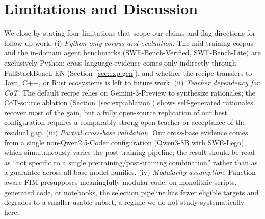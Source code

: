 \section{Limitations and Discussion}
\vspace{-0.5ex}
\label{sec:limitations}

We close by stating four limitations that scope our claims and flag
directions for follow-up work.
(i) \textit{Python-only corpus and evaluation.} The mid-training corpus
and the in-domain agent benchmarks (SWE-Bench-Verified, SWE-Bench-Lite)
are exclusively Python; cross-language evidence comes only indirectly
through FullStackBench-EN (Section~\ref{sec:exp:gen}), and whether the
recipe transfers to Java, C++, or Rust ecosystems is left to future work.
(ii) \textit{Teacher dependency for CoT.} The default recipe relies on
Gemini-3-Preview to synthesize rationales; the CoT-source ablation
(Section~\ref{sec:exp:ablation}) shows self-generated rationales recover
most of the gain, but a fully open-source replication of our best
configuration requires a comparably strong open teacher or acceptance of
the residual gap.
(iii) \textit{Partial cross-base validation.} Our cross-base evidence
comes from a single non-Qwen2.5-Coder configuration (Qwen3-8B with
SWE-Lego), which simultaneously varies the post-training pipeline; the
result should be read as ``not specific to a single
pretraining/post-training combination'' rather than as a guarantee across
all base-model families.
(iv) \textit{Modularity assumption.} Function-aware FIM presupposes
meaningfully modular code; on monolithic scripts, generated code, or
notebooks, the selection pipeline has fewer eligible targets and degrades
to a smaller usable subset, a regime we do not study systematically here.
